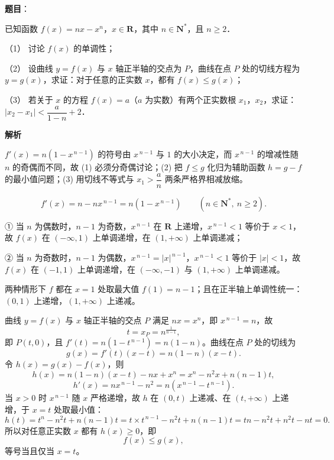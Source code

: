 \begin{answer}

\textbf{题目}：

已知函数 \(f(x)=nx-x^n\)，\(x\in\mathbf{R}\)，其中 \(n\in\mathbf{N}^{*}\)，且 \(n\geqslant2\)．

（1） 讨论 \(f(x)\) 的单调性；

（2） 设曲线 \(y=f(x)\) 与 \(x\) 轴正半轴的交点为 \(P\)，曲线在点 \(P\) 处的切线方程为 \(y=g(x)\)，求证：对于任意的正实数 \(x\)，都有 \(f(x)\leqslant g(x)\)；

（3） 若关于 \(x\) 的方程 \(f(x)=a\)（\(a\) 为实数）有两个正实数根 \(x_1\)，\(x_2\)，求证：\(|x_2-x_1|<\dfrac{a}{1-n}+2\)．

\textbf{解析}

\(f'(x)=n\left(1-x^{\,n-1}\right)\) 的符号由 \(x^{\,n-1}\) 与 \(1\) 的大小决定，而 \(x^{\,n-1}\) 的增减性随 \(n\) 的奇偶而不同，故 (1) 必须分奇偶讨论；(2) 把 \(f\leqslant g\) 化归为辅助函数 \(h=g-f\) 的最小值问题；(3) 用切线不等式与 \(x_{1}>\dfrac{a}{n}\) 两条严格界相减放缩。


\nopagebreak[4]
\[
f'(x)=n-nx^{\,n-1}=n\left(1-x^{\,n-1}\right)\qquad(n\in\mathbf{N}^{*},\ n\geqslant2).
\]

① 当 \(n\) 为偶数时，\(n-1\) 为奇数，\(x^{\,n-1}\) 在 \(\mathbf{R}\) 上递增，\(x^{\,n-1}<1\) 等价于 \(x<1\)，故 \(f(x)\) 在 \((-\infty,1)\) 上单调递增，在 \((1,+\infty)\) 上单调递减；

② 当 \(n\) 为奇数时，\(n-1\) 为偶数，\(x^{\,n-1}=|x|^{\,n-1}\)，\(x^{\,n-1}<1\) 等价于 \(|x|<1\)，故 \(f(x)\) 在 \((-1,1)\) 上单调递增，在 \((-\infty,-1)\) 与 \((1,+\infty)\) 上单调递减。

两种情形下 \(f\) 都在 \(x=1\) 处取最大值 \(f(1)=n-1\)；且在正半轴上单调性统一：\((0,1)\) 上递增，\((1,+\infty)\) 上递减。


曲线 \(y=f(x)\) 与 \(x\) 轴正半轴的交点 \(P\) 满足 \(nx=x^{n}\)，即 \(x^{\,n-1}=n\)，故
\nopagebreak[4]
\[
t=x_{P}=n^{\frac{1}{n-1}},
\]
即 \(P(t,0)\)，且 \(f'(t)=n\left(1-t^{\,n-1}\right)=n(1-n)\)。曲线在点 \(P\) 处的切线为
\nopagebreak[4]
\[
g(x)=f'(t)(x-t)=n(1-n)(x-t).
\]
令 \(h(x)=g(x)-f(x)\)，则
\nopagebreak[4]
\[
h(x)=n(1-n)(x-t)-nx+x^{n}=x^{n}-n^{2}x+n(n-1)t,
\]
\nopagebreak[4]
\[
h'(x)=nx^{\,n-1}-n^{2}=n\left(x^{\,n-1}-t^{\,n-1}\right).
\]
当 \(x>0\) 时 \(x^{\,n-1}\) 随 \(x\) 严格递增，故 \(h\) 在 \((0,t)\) 上递减、在 \((t,+\infty)\) 上递增，于 \(x=t\) 处取最小值：
\nopagebreak[4]
\[
h(t)=t^{n}-n^{2}t+n(n-1)t=t\times t^{\,n-1}-n^{2}t+n(n-1)t=tn-n^{2}t+n^{2}t-nt=0 .
\]
所以对任意正实数 \(x\) 都有 \(h(x)\geqslant0\)，即
\nopagebreak[4]
\[
f(x)\leqslant g(x),
\]
等号当且仅当 \(x=t\)。


\end{answer}
